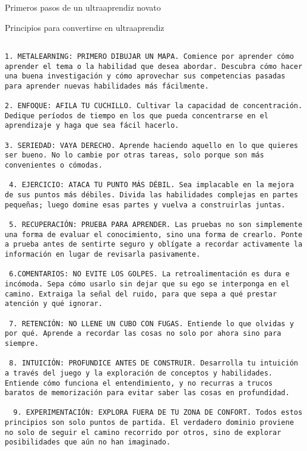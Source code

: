 Primeros pasos de un ultraaprendiz novato


Principios para convertirse en ultraaprendiz

\begin{verbatim}

1. METALEARNING: PRIMERO DIBUJAR UN MAPA. Comience por aprender cómo aprender el tema o la habilidad que desea abordar. Descubra cómo hacer una buena investigación y cómo aprovechar sus competencias pasadas para aprender nuevas habilidades más fácilmente.

2. ENFOQUE: AFILA TU CUCHILLO. Cultivar la capacidad de concentración. Dedique períodos de tiempo en los que pueda concentrarse en el aprendizaje y haga que sea fácil hacerlo. 

3. SERIEDAD: VAYA DERECHO. Aprende haciendo aquello en lo que quieres ser bueno. No lo cambie por otras tareas, solo porque son más convenientes o cómodas.

 4. EJERCICIO: ATACA TU PUNTO MÁS DÉBIL. Sea implacable en la mejora de sus puntos más débiles. Divida las habilidades complejas en partes pequeñas; luego domine esas partes y vuelva a construirlas juntas.
 
 5. RECUPERACIÓN: PRUEBA PARA APRENDER. Las pruebas no son simplemente una forma de evaluar el conocimiento, sino una forma de crearlo. Ponte a prueba antes de sentirte seguro y oblígate a recordar activamente la información en lugar de revisarla pasivamente. 

 6.COMENTARIOS: NO EVITE LOS GOLPES. La retroalimentación es dura e incómoda. Sepa cómo usarlo sin dejar que su ego se interponga en el camino. Extraiga la señal del ruido, para que sepa a qué prestar atención y qué ignorar.
 
 7. RETENCIÓN: NO LLENE UN CUBO CON FUGAS. Entiende lo que olvidas y por qué. Aprende a recordar las cosas no solo por ahora sino para siempre. 
 
 8. INTUICIÓN: PROFUNDICE ANTES DE CONSTRUIR. Desarrolla tu intuición a través del juego y la exploración de conceptos y habilidades. Entiende cómo funciona el entendimiento, y no recurras a trucos baratos de memorización para evitar saber las cosas en profundidad. 
 
  9. EXPERIMENTACIÓN: EXPLORA FUERA DE TU ZONA DE CONFORT. Todos estos principios son solo puntos de partida. El verdadero dominio proviene no solo de seguir el camino recorrido por otros, sino de explorar posibilidades que aún no han imaginado. 
\end{verbatim}